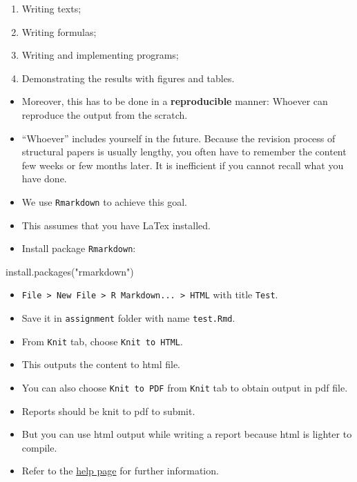 \documentclass[
]{book}
\newenvironment{Shaded}{\begin{snugshade}}{\end{snugshade}}
\newcommand{\FunctionTok}[1]{\textcolor[rgb]{0.00,0.00,0.00}{#1}}
\newcommand{\NormalTok}[1]{#1}
\newcommand{\StringTok}[1]{\textcolor[rgb]{0.31,0.60,0.02}{#1}}
\providecommand{\tightlist}{%
  \setlength{\itemsep}{0pt}\setlength{\parskip}{0pt}}
\begin{document}
\begin{enumerate}
\def\labelenumi{\arabic{enumi}.}
\tightlist
\item
  Writing texts;
\item
  Writing formulas;
\item
  Writing and implementing programs;
\item
  Demonstrating the results with figures and tables.
\end{enumerate}

\begin{itemize}
\item
  Moreover, this has to be done in a \textbf{reproducible} manner: Whoever can reproduce the output from the scratch.
\item
  ``Whoever'' includes yourself in the future. Because the revision process of structural papers is usually lengthy, you often have to remember the content few weeks or few months later. It is inefficient if you cannot recall what you have done.
\item
  We use \texttt{Rmarkdown} to achieve this goal.
\item
  This assumes that you have LaTex installed.
\item
  Install package \texttt{Rmarkdown}:
\end{itemize}

\begin{Shaded}
\begin{Highlighting}[]
\FunctionTok{install.packages}\NormalTok{(}\StringTok{"rmarkdown"}\NormalTok{)}
\end{Highlighting}
\end{Shaded}

\begin{itemize}
\tightlist
\item
  \texttt{File\ \textgreater{}\ New\ File\ \textgreater{}\ R\ Markdown...\ \textgreater{}\ HTML} with title \texttt{Test}.
\item
  Save it in \texttt{assignment} folder with name \texttt{test.Rmd}.
\item
  From \texttt{Knit} tab, choose \texttt{Knit\ to\ HTML}.
\item
  This outputs the content to html file.
\item
  You can also choose \texttt{Knit\ to\ PDF} from \texttt{Knit} tab to obtain output in pdf file.
\item
  Reports should be knit to pdf to submit.
\item
  But you can use html output while writing a report because html is lighter to compile.
\item
  Refer to the \href{https://rmarkdown.rstudio.com/lesson-1.html}{help page} for further information.
\end{itemize}
\end{document}
